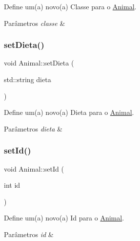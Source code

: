 Define um(a) novo(a) Classe para o \hyperlink{classAnimal}{Animal}. 


\begin{DoxyParams}{Parâmetros}
{\em classe} & \\
\hline
\end{DoxyParams}
\mbox{\label{classAnimal_a1b6ae4e4360c2a3b15c1759a654ef84b}} 
\subsubsection{\texorpdfstring{set\+Dieta()}{setDieta()}}
{\footnotesize\ttfamily void Animal\+::set\+Dieta (\begin{DoxyParamCaption}\item[{std\+::string}]{dieta }\end{DoxyParamCaption})}



Define um(a) novo(a) Dieta para o \hyperlink{classAnimal}{Animal}. 


\begin{DoxyParams}{Parâmetros}
{\em dieta} & \\
\hline
\end{DoxyParams}
\mbox{\label{classAnimal_af5a262e8a6e04632a48307101494925c}} 
\subsubsection{\texorpdfstring{set\+Id()}{setId()}}
{\footnotesize\ttfamily void Animal\+::set\+Id (\begin{DoxyParamCaption}\item[{int}]{id }\end{DoxyParamCaption})}



Define um(a) novo(a) Id para o \hyperlink{classAnimal}{Animal}. 


\begin{DoxyParams}{Parâmetros}
{\em id} & \\
\hline
\end{DoxyParams}
\mbox{\label{classAnimal_a6f77d89ef0c02d85dfe1dd7508122ce3}} 
